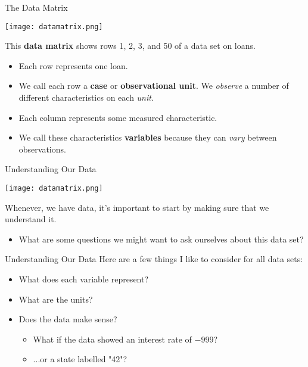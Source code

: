 \begin{frame}{The Data Matrix}
    \begin{center}
        \texttt{[image: datamatrix.png]}
    \end{center}
    This \textbf{data matrix} shows rows 1, 2, 3, and 50 of a data set on loans. 
    \begin{itemize}
        \item Each row represents one loan.
        \item We call each row a \textbf{case} or \textbf{observational unit}. We \textit{observe} a number of different characteristics on each \textit{unit}.
        \item Each column represents some measured characteristic.
        \item We call these characteristics \textbf{variables} because they can \textit{vary} between observations. 
    \end{itemize}
\end{frame}

\begin{frame}{Understanding Our Data}
    \begin{center}
        \texttt{[image: datamatrix.png]}
    \end{center}
    Whenever, we have data, it's important to start by making sure that we understand it. 
    \begin{itemize}
        \item What are some questions we might want to ask ourselves about this data set?
    \end{itemize}
\end{frame}

\begin{frame}{Understanding Our Data}
    Here are a few things I like to consider for all data sets:
    \begin{itemize}
        \item What does each variable represent?
        \item What are the units?
        \item Does the data make sense?
        \begin{itemize}
            \item What if the data showed an interest rate of $-999$?
            \item ...or a state labelled "42"?
        \end{itemize}
    \end{itemize}
\end{frame}

